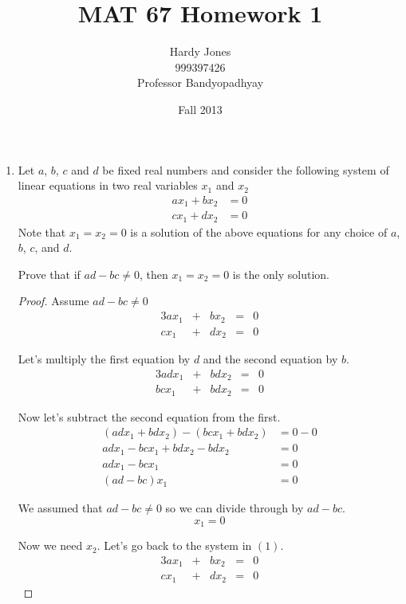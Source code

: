 \documentclass[12pt,letterpaper]{article}
\title{MAT 67 Homework 1\vspace{-2ex}}
\author{Hardy Jones\\
        999397426\\
        Professor Bandyopadhyay\vspace{-2ex}}
\date{Fall 2013}
\begin{document}
  \maketitle

  \begin{enumerate}
    \item
      Let $a$, $b$, $c$ and $d$ be fixed real numbers and
      consider the following system of linear equations in two real variables
      $x_1$ and $x_2$
      \begin{align*}
        ax_1 + bx_2 &= 0 \\
        cx_1 + dx_2 &= 0
      \end{align*}
      Note that $x_1 = x_2 = 0$ is a solution of the above equations for any
      choice of $a$, $b$, $c$, and $d$.

      Prove that if $ad - bc \neq 0$, then $x_1 = x_2 = 0$ is the only solution.

      \begin{proof}
        Assume $ad - bc \neq 0$
        \begin{alignat*}{3}
          ax_1 & {} + {} & bx_2 & {} = {} & 0 \\
          cx_1 & {} + {} & dx_2 & {} = {} & 0 \tag{1}
        \end{alignat*}

        Let's multiply the first equation by $d$ and the second equation by $b$.
        \begin{alignat*}{3}
          adx_1 & {} + {} & bdx_2 & {} = {} & 0 \\
          bcx_1 & {} + {} & bdx_2 & {} = {} & 0
        \end{alignat*}

        Now let's subtract the second equation from the first.
        \begin{align*}
          (adx_1 + bdx_2) - (bcx_1 + bdx_2) &= 0 - 0 \\
          adx_1 - bcx_1 + bdx_2 - bdx_2 &= 0 \\
          adx_1 - bcx_1 &= 0 \\
          (ad - bc)x_1 &= 0
        \end{align*}

        We assumed that $ad-bc \neq 0$ so we can divide through by $ad - bc$.
        \[x_1 = 0\]

        Now we need $x_2$.  Let's go back to the system in $(1)$.
        \begin{alignat*}{3}
          ax_1 & {} + {} & bx_2 & {} = {} & 0 \\
          cx_1 & {} + {} & dx_2 & {} = {} & 0 \tag{1}
        \end{alignat*}


\end{proof}
\end{enumerate}
\end{document}
